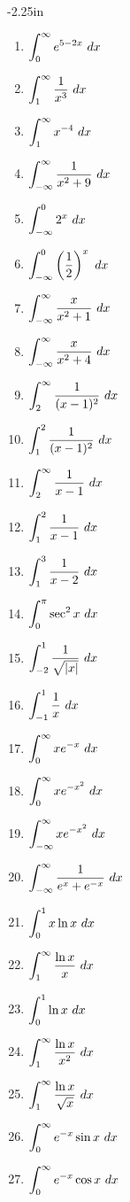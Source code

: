 \begin{adjustwidth*}{}{-2.25in}
\begin{multicols*}{2}
\begin{enumerate}[1),resume]
\item $\ds \int_0^\infty e^{5-2x}\ dx$
\item $\ds \int_1^\infty \frac{1}{x^3}\ dx$
\item $\ds \int_1^\infty x^{-4}\ dx$
\item $\displaystyle \int_{-\infty}^\infty \frac{1}{x^2+9}\ dx$
\item $\ds \int_{-\infty}^0 2^x\ dx$
\item $\displaystyle \int_{-\infty}^0 \left(\frac12\right)^x\ dx$
\item $\displaystyle \int_{-\infty}^\infty\frac{x}{x^2+1}\ dx$
\item $\displaystyle \int_{-\infty}^\infty\frac{x}{x^2+4}\ dx$
\item $\ds \int_{2}^\infty\frac{1}{(x-1)^2}\ dx$
\item $\ds \int_{1}^2\frac{1}{(x-1)^2}\ dx$
\item $\ds \int_{2}^\infty\frac{1}{x-1}\ dx$
\item $\ds \int_{1}^2\frac{1}{x-1}\ dx$
\item $\ds \int_{1}^3\frac{1}{x-2}\ dx$
\item $\ds \int_{0}^\pi \sec^2 x\ dx$
\item $\ds \int_{-2}^1 \frac{1}{\sqrt{|x|}} \ dx$
\item $\ds \int_{-1}^1 \frac 1x \ dx$
\item $\ds \int_{0}^\infty xe^{-x} \ dx$
\item $\ds \int_{0}^\infty xe^{-x^2} \ dx$
\item $\ds \int_{-\infty}^\infty xe^{-x^2} \ dx$
\item $\displaystyle \int_{-\infty}^\infty \frac{1}{e^x+e^{-x}} \ dx$
\item $\ds \int_{0}^1 x\ln x \ dx$
\item $\ds \int_{1}^\infty \frac{\ln x}{x} \ dx$
\item $\ds \int_{0}^1 \ln x \ dx$
\item $\displaystyle \int_{1}^\infty \frac{\ln x}{x^2} \ dx$
\item $\displaystyle \int_{1}^\infty \frac{\ln x}{\sqrt{x}} \ dx$
\item $\ds \int_{0}^\infty e^{-x}\sin x \ dx$
\item $\ds \int_{0}^\infty e^{-x}\cos x \ dx$
\end{enumerate}



\end{multicols*}
\end{adjustwidth*}
